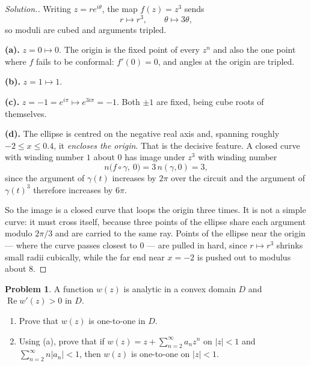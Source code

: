 \documentclass[11pt,a4paper]{article}
\theoremstyle{definition}
\newtheorem{problemx}{Problem}[section]
\newenvironment{problem}{\begin{problemx}}{\end{problemx}}
\newenvironment{solution}
  {\renewcommand{\qedsymbol}{}\begin{proof}[\textit{Solution}.]}
  {\end{proof}}
\begin{document}
\begin{solution}
Writing $z = re^{i\theta}$, the map $f(z) = z^3$ sends
$$r \longmapsto r^{3},\qquad \theta \longmapsto 3\theta ,$$
so moduli are cubed and arguments tripled.

\textbf{(a).} $z = 0 \mapsto 0$. The origin is the fixed point of every $z^n$ and
also the one point where $f$ fails to be conformal: $f'(0) = 0$, and angles at the
origin are tripled.

\textbf{(b).} $z = 1 \mapsto 1$.

\textbf{(c).} $z = -1 = e^{i\pi} \mapsto e^{3i\pi} = -1$. Both $\pm 1$ are fixed,
being cube roots of themselves.

\textbf{(d).} The ellipse is centred on the negative real axis and, spanning
roughly $-2 \leq x \leq 0.4$, it \emph{encloses the origin}. That is the decisive
feature. A closed curve with winding number $1$ about $0$ has image under $z^3$
with winding number
$$n\big(f\circ\gamma,\ 0\big) = 3\,n(\gamma, 0) = 3,$$
since the argument of $\gamma(t)$ increases by $2\pi$ over the circuit and the
argument of $\gamma(t)^3$ therefore increases by $6\pi$.

So the image is a closed curve that loops the origin three times. It is not a
simple curve: it must cross itself, because three points of the ellipse share
each argument modulo $2\pi/3$ and are carried to the same ray. Points of the
ellipse near the origin --- where the curve passes closest to $0$ --- are pulled in
hard, since $r \mapsto r^3$ shrinks small radii cubically, while the far end near
$x = -2$ is pushed out to modulus about $8$.
\end{solution}


\begin{problem}
A function $w(z)$ is analytic in a convex domain $D$ and
$\operatorname{Re}w'(z) > 0$ in $D$.
\begin{enumerate}
\item[(a).] Prove that $w(z)$ is one-to-one in $D$.
\item[(b).] Using (a), prove that if
$w(z) = z + \displaystyle\sum^{\infty}_{n=2} a_n z^{n}$ on
$\left|z\right| < 1$ and $\displaystyle\sum^{\infty}_{n=2} n\left|a_n\right| < 1$,
then $w(z)$ is one-to-one on $\left|z\right| < 1$.
\end{enumerate}
\end{problem}
\end{document}
